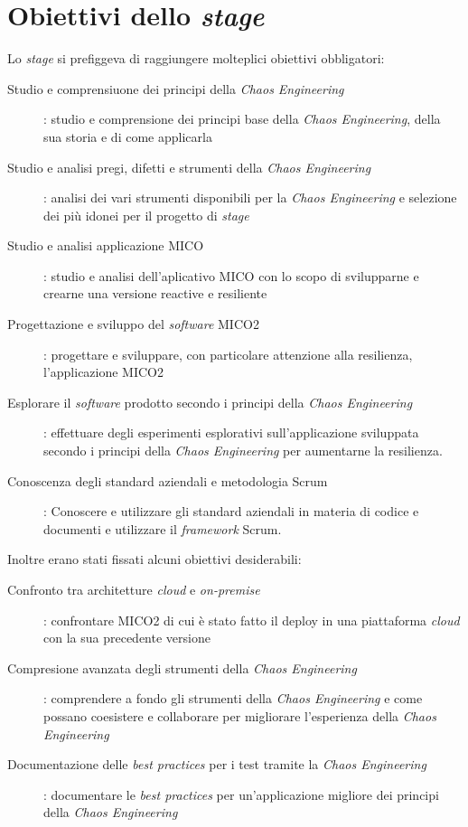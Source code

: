\section{Obiettivi dello \textit{stage}}
Lo \textit{stage} si prefiggeva di raggiungere molteplici obiettivi obbligatori:

\begin{description}
    \item[Studio e comprensiuone dei principi della \textit{Chaos Engineering}]: studio e comprensione dei principi base della \textit{Chaos Engineering}, della sua storia e di come applicarla
    \item[Studio e analisi pregi, difetti e strumenti della \textit{Chaos Engineering}]: analisi dei vari strumenti disponibili per la \textit{Chaos Engineering} e selezione dei più idonei per il progetto di \textit{stage}
    \item[Studio e analisi applicazione MICO]: studio e analisi dell'aplicativo MICO con lo scopo di svilupparne e crearne una versione reactive e resiliente
    \item[Progettazione e sviluppo del \textit{software} MICO2]: progettare e sviluppare, con particolare attenzione alla resilienza, l'applicazione MICO2
    \item[Esplorare il \textit{software} prodotto secondo i principi della \textit{Chaos Engineering}]: effettuare degli esperimenti esplorativi sull'applicazione sviluppata secondo i principi della \textit{Chaos Engineering} per aumentarne la resilienza.
    \item[Conoscenza degli standard aziendali e metodologia Scrum]: Conoscere e utilizzare gli standard aziendali in materia di codice e documenti e utilizzare il \textit{framework} Scrum.   
\end{description}

Inoltre erano stati fissati alcuni obiettivi desiderabili:
\begin{description}
    \item[Confronto tra architetture \textit{cloud} e \textit{on-premise}]: confrontare MICO2 di cui è stato fatto il deploy in una piattaforma \textit{cloud} con la sua precedente versione
    \item[Compresione avanzata degli strumenti della \textit{Chaos Engineering}]: comprendere a fondo gli strumenti della \textit{Chaos Engineering} e come possano coesistere e collaborare per migliorare l'esperienza della \textit{Chaos Engineering}
    \item[Documentazione delle \textit{best practices} per i test tramite la \textit{Chaos Engineering}]: documentare le \textit{best practices} per un'applicazione migliore dei principi della \textit{Chaos Engineering}   
\end{description}



